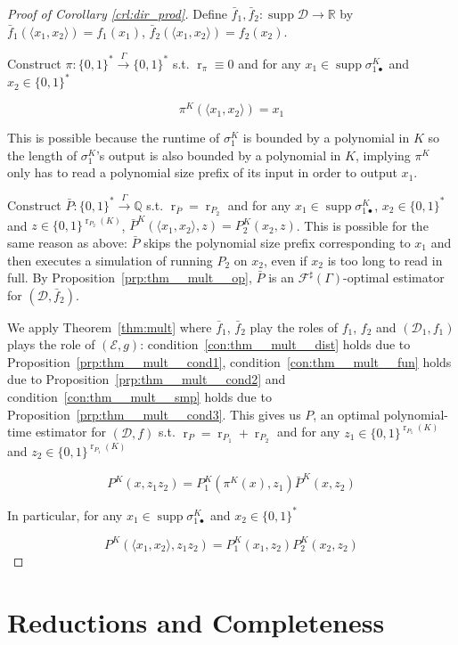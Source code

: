 \documentclass{article}
\numberwithin{equation}{section}
\theoremstyle{definition}
\theoremstyle{plain}
\newcommand{\Bool}{\{0,1\}}
\newcommand{\Words}{{\Bool^*}}
\DeclareMathOperator{\Supp}{supp}
\DeclareMathOperator{\R}{r}
\newcommand{\Rats}{\mathbb{Q}}
\newcommand{\Reals}{\mathbb{R}}
\newcommand{\Chev}[1]{\langle #1 \rangle}
\newcommand{\Dist}{\mathcal{D}}
\newcommand{\Fall}{\mathcal{F}}
\newcommand{\ESG}{\Fall^\sharp(\Gamma)}
\newcommand{\Scheme}{\xrightarrow{\Gamma}}
\begin{document}
\begin{proof}[Proof of Corollary \ref{crl:dir_prod}]

Define $\bar{f}_1, \bar{f}_2: \Supp \Dist \rightarrow \Reals$ by $\bar{f}_1(\Chev{x_1,x_2})=f_1(x_1)$, $\bar{f}_2(\Chev{x_1,x_2})=f_2(x_2)$. 

Construct $\pi: \Words \Scheme \Words$ s.t. $\R_\pi \equiv 0$ and for any ${x_1 \in \Supp \sigma_{1\bullet}^K}$ and $x_2 \in \Words$ 

\[\pi^K(\Chev{x_1,x_2})=x_1\]

This is possible because the runtime of $\sigma_1^K$ is bounded by a polynomial in $K$ so the length of $\sigma_{1}^K$'s output is also bounded by a polynomial in $K$, implying $\pi^K$ only has to read a polynomial size prefix of its input in order to output $x_1$.

Construct $\bar{P}: \Words \Scheme \Rats$ s.t. $\R_{\bar{P}}=\R_{P_2}$ and for any $x_1 \in \Supp \sigma_{1\bullet}^K$, $x_2 \in \Words$ and $z \in \Bool^{\R_{P_2}(K)}$, $\bar{P}^K(\Chev{x_1,x_2},z)=P_2^K(x_2,z)$. This is possible for the same reason as above: $\bar{P}$ skips the polynomial size prefix corresponding to $x_1$ and then executes a simulation of running $P_2$ on $x_2$, even if $x_2$ is too long to read in full. By Proposition~\ref{prp:thm__mult__op}, $\bar{P}$ is an $\ESG$-optimal estimator for $(\Dist,\bar{f}_2)$. 

We apply Theorem~\ref{thm:mult} where $\bar{f}_1$, $\bar{f}_2$ play the roles of $f_1$, $f_2$ and $(\Dist_1, f_1)$ plays the role of $(\mathcal{E},g)$: condition~\ref{con:thm__mult__dist} holds due to Proposition~\ref{prp:thm__mult__cond1}, condition~\ref{con:thm__mult__fun} holds due to Proposition~\ref{prp:thm__mult__cond2} and condition~\ref{con:thm__mult__smp} holds due to Proposition~\ref{prp:thm__mult__cond3}. This gives us $P$, an optimal polynomial-time estimator for $(\Dist, f)$ s.t. ${\R_P=\R_{P_1}+\R_{P_2}}$ and for any ${z_1 \in \Bool^{\R_{P_1}(K)}}$ and $z_2 \in \Bool^{\R_{P_1}(K)}$ 

\[P^K(x, z_1 z_2) = P_1^K(\pi^K(x),z_1) \bar{P}^K(x,z_2)\]

In particular, for any ${x_1 \in \Supp \sigma_{1\bullet}^K}$ and $x_2 \in \Words$

\[P^K(\Chev{x_1,x_2}, z_1 z_2)=P_1^K(x_1,z_2)P_2^K(x_2,z_2)\]
%
\end{proof}

\section{Reductions and Completeness}
\label{sec:reductions}
\end{document}

